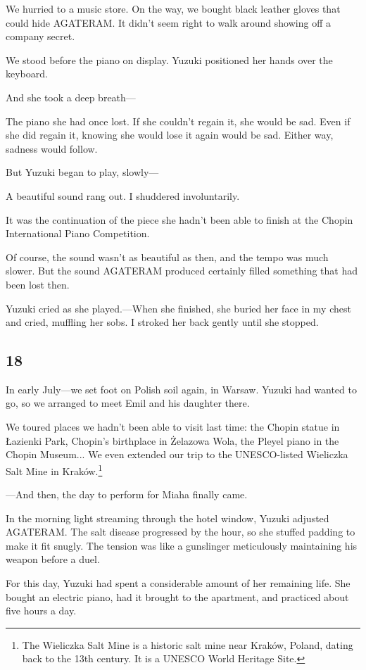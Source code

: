 \documentclass[
    a4paper,
    12pt,
    twoside,
    openany,
    UTF8,
    fontset=windows
]{ctexbook}
\begin{document}
We hurried to a music store. On the way, we bought black leather gloves that could hide AGATERAM. It didn't seem right to walk around showing off a company secret.

We stood before the piano on display. Yuzuki positioned her hands over the keyboard.

And she took a deep breath---

The piano she had once lost. If she couldn't regain it, she would be sad. Even if she did regain it, knowing she would lose it again would be sad. Either way, sadness would follow.

But Yuzuki began to play, slowly---

A beautiful sound rang out. I shuddered involuntarily.

It was the continuation of the piece she hadn't been able to finish at the Chopin International Piano Competition.

Of course, the sound wasn't as beautiful as then, and the tempo was much slower. But the sound AGATERAM produced certainly filled something that had been lost then.

Yuzuki cried as she played.---When she finished, she buried her face in my chest and cried, muffling her sobs. I stroked her back gently until she stopped.


\subsection*{18}

In early July---we set foot on Polish soil again, in Warsaw. Yuzuki had wanted to go, so we arranged to meet Emil and his daughter there.

We toured places we hadn't been able to visit last time: the Chopin statue in Łazienki Park, Chopin's birthplace in Żelazowa Wola, the Pleyel piano in the Chopin Museum... We even extended our trip to the UNESCO-listed Wieliczka Salt Mine in Kraków.\footnote{The Wieliczka Salt Mine is a historic salt mine near Kraków, Poland, dating back to the 13th century. It is a UNESCO World Heritage Site.}

---And then, the day to perform for Miaha finally came.

In the morning light streaming through the hotel window, Yuzuki adjusted AGATERAM. The salt disease progressed by the hour, so she stuffed padding to make it fit snugly. The tension was like a gunslinger meticulously maintaining his weapon before a duel.

For this day, Yuzuki had spent a considerable amount of her remaining life. She bought an electric piano, had it brought to the apartment, and practiced about five hours a day.
\end{document}

